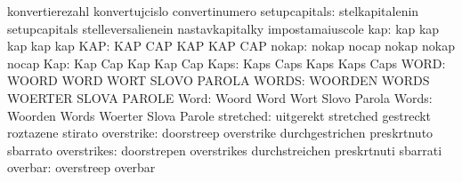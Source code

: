                                   konvertierezahl                  konvertujcislo
                                  convertinumero
                   setupcapitals: stelkapitalenin                  setupcapitals
                                  stelleversalienein               nastavkapitalky
                                  impostamaiuscole
                             kap: kap                              kap
                                  kap                              kap
                                  kap
                             KAP: KAP                              CAP
                                  KAP                              KAP
                                  CAP
                           nokap: nokap                            nocap
                                  nokap                            nokap
                                  nocap
                             Kap: Kap                              Cap
                                  Kap                              Kap
                                  Cap
                            Kaps: Kaps                             Caps
                                  Kaps                             Kaps
                                  Caps
                            WORD: WOORD                            WORD
                                  WORT                             SLOVO
                                  PAROLA
                           WORDS: WOORDEN                          WORDS
                                  WOERTER                          SLOVA
                                  PAROLE
                            Word: Woord                            Word
                                  Wort                             Slovo
                                  Parola
                           Words: Woorden                          Words
                                  Woerter                          Slova
                                  Parole
                       stretched: uitgerekt                        stretched
                                  gestreckt                        roztazene
                                  stirato
                      overstrike: doorstreep                       overstrike
                                  durchgestrichen                  preskrtnuto
                                  sbarrato
                     overstrikes: doorstrepen                      overstrikes
                                  durchstreichen                   preskrtnuti
                                  sbarrati
                         overbar: overstreep                       overbar
